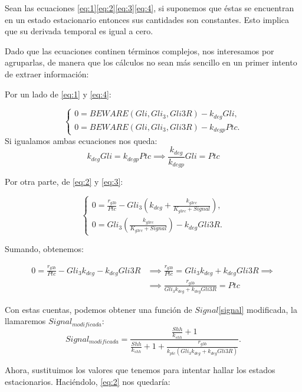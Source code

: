 Sean las ecuaciones \ref{eq:1}\ref{eq:2}\ref{eq:3}\ref{eq:4}, si suponemos que éstas se encuentran en un estado estacionario entonces sus cantidades son constantes. Esto implica que su derivada temporal es igual a cero.

Dado que las ecuaciones continen términos complejos, nos interesamos por agruparlas, de manera que los cálculos no sean más sencillo en un primer intento de extraer información:

Por un lado de \ref{eq:1} y \ref{eq:4}:

$$\begin{cases} 0 = BEWARE(Gli, Gli_3, Gli3R)-k_{deg}Gli, \\0= BEWARE(Gli, Gli_3, Gli3R)-k_{degp}Ptc. \end{cases}$$
Si igualamos ambas ecuaciones nos queda:
\begin{equation}
 k_{deg}Gli=k_{degp}Ptc \implies \frac{k_{deg}}{k_{degp}}Gli=Ptc
\end{equation}

Por otra parte, de \ref{eq:2} y \ref{eq:3}:



$$\begin{cases} 0 = \frac{r_{g3b}}{Ptc}-Gli_3\left(k_{deg}+\frac{k_{g3rc}}{K_{g3rc}+Signal}\right), \\0=Gli_3\left(\frac{k_{g3rc}}{K_{g3rc}+Signal}\right)-k_{deg}Gli3R. \end{cases}$$

Sumando, obtenemos:

\begin{equation}
\begin{split}
0=\frac{r_{g3b}}{Ptc}-Gli_3k_{deg}-k_{deg}Gli3R & \implies \frac{r_{g3b}}{Ptc}=Gli_3k_{deg}+k_{deg}Gli3R\implies
 \\
& \implies \frac{r_{g3b}}{Gli_3k_{deg}+k_{deg}Gli3R}=Ptc
\end{split}
\end{equation}

Con estas cuentas, podemos obtener una función de $Signal$\ref{signal} modificada, la llamaremos $Signal_{modificada}$:
 \begin{equation}
 Signal_{modificada}=\frac{\frac{Shh}{k_{shh}} + 1}{\frac{Shh}{k_{shh}} + 1 + \frac{r_{g3b}}{k_{ptc}(Gli_3k_{deg}+k_{deg}Gli3R)}}.
 \end{equation}
 
Ahora, sustituimos los valores que tenemos para intentar hallar los estados estacionarios. Haciéndolo, \ref{eq:2} nos quedaría:

